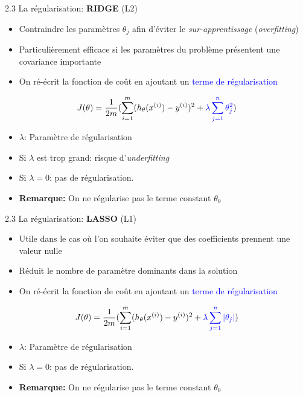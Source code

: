 \begin{frame}{2.3 La régularisation: \textbf{RIDGE} (L2)}
  \begin{itemize}
  \item Contraindre les paramètres $\theta_{j}$ afin d'éviter le \textit{sur-apprentissage} (\textit{overfitting})
  \item Particulièrement efficace si les paramètres du problème présentent une covariance importante
  \item On ré-écrit la fonction de coût en ajoutant un \textcolor{blue}{terme de régularisation}
  \end{itemize}
  \begin{equation*}
    J(\theta) = \frac{1}{2m}(\displaystyle\sum_{i=1}^{m}(h_{\theta}(x^{(i)}) - y^{(i)})^{2} + \textcolor{blue}{\lambda \displaystyle\sum_{j=1}^{n}\theta_{j}^{2}})
  \end{equation*}
  \begin{itemize}
  \item \boldmath $\lambda$: Paramètre de régularisation
  \item Si $\lambda$ est trop grand: risque d'\textit{underfitting}
  \item Si $\lambda = 0$: pas de régularisation. 
  \item \textbf{Remarque:} On ne régularise pas le terme constant $\theta_{0}$
  \end{itemize}
\end{frame}

\begin{frame}{2.3 La régularisation: \textbf{LASSO} (L1)}
  \begin{itemize}
  \item Utile dans le cas où l'on souhaite éviter que des coefficients prennent une valeur nulle
  \item Réduit le nombre de paramètre dominants dans la solution
  \item On ré-écrit la fonction de coût en ajoutant un \textcolor{blue}{terme de régularisation}
  \end{itemize}
  \begin{equation*}
    J(\theta) = \frac{1}{2m}(\displaystyle\sum_{i=1}^{m}(h_{\theta}(x^{(i)}) - y^{(i)})^{2} + \textcolor{blue}{\lambda \displaystyle\sum_{j=1}^{n}|\theta_{j}|})
  \end{equation*}
  \begin{itemize}
  \item \boldmath $\lambda$: Paramètre de régularisation
  \item Si $\lambda = 0$: pas de régularisation. 
  \item \textbf{Remarque:} On ne régularise pas le terme constant $\theta_{0}$
  \end{itemize}
\end{frame}

